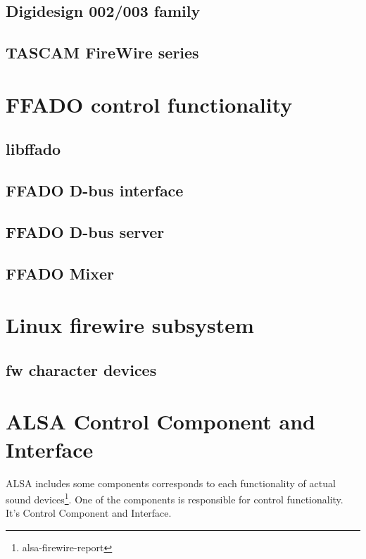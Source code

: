 \documentclass[onecolumn]{article}
\begin{document}
\subsection{Digidesign 002/003 family}

\subsection{TASCAM FireWire series}

\section{FFADO control functionality}

\subsection{libffado}

\subsection{FFADO D-bus interface}

\subsection{FFADO D-bus server}

\subsection{FFADO Mixer}

\section{}

\section{Linux firewire subsystem}

\subsection{fw character devices}


\section{ALSA Control Component and Interface}

ALSA includes some components corresponds to each functionality of actual sound devices\footnote{alsa-firewire-report}. One of the components is responsible for control functionality. It's Control Component and Interface.
\end{document}
